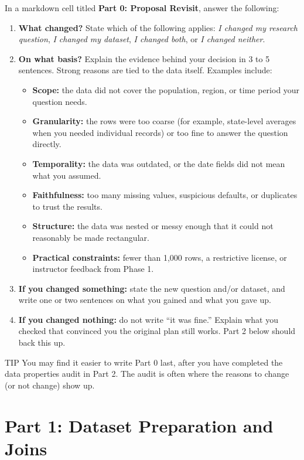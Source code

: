 \documentclass[11pt,letterpaper]{article}
\begin{document}
In a markdown cell titled \textbf{Part 0: Proposal Revisit}, answer the following:
\begin{enumerate}
  \item \textbf{What changed?} State which of the following applies: \emph{I changed my research question}, \emph{I changed my dataset}, \emph{I changed both}, or \emph{I changed neither}.
  \item \textbf{On what basis?} Explain the evidence behind your decision in 3 to 5 sentences. Strong reasons are tied to the data itself. Examples include:
  \begin{itemize}
    \item \textbf{Scope:} the data did not cover the population, region, or time period your question needs.
    \item \textbf{Granularity:} the rows were too coarse (for example, state-level averages when you needed individual records) or too fine to answer the question directly.
    \item \textbf{Temporality:} the data was outdated, or the date fields did not mean what you assumed.
    \item \textbf{Faithfulness:} too many missing values, suspicious defaults, or duplicates to trust the results.
    \item \textbf{Structure:} the data was nested or messy enough that it could not reasonably be made rectangular.
    \item \textbf{Practical constraints:} fewer than 1,000 rows, a restrictive license, or instructor feedback from Phase 1.
  \end{itemize}
  \item \textbf{If you changed something:} state the new question and/or dataset, and write one or two sentences on what you gained and what you gave up.
  \item \textbf{If you changed nothing:} do not write ``it was fine.'' Explain what you checked that convinced you the original plan still works. Part 2 below should back this up.
\end{enumerate}

\begin{callout}{TIP}
You may find it easier to write Part 0 last, after you have completed the data properties audit in Part 2. The audit is often where the reasons to change (or not change) show up.
\end{callout}

\section{Part 1: Dataset Preparation and Joins}
\end{document}
